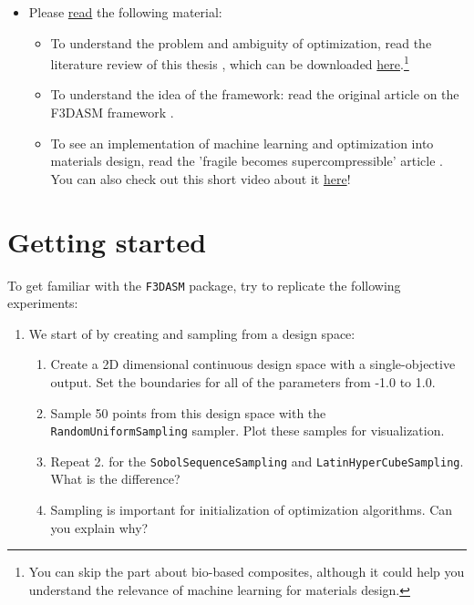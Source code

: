 \documentclass[10pt,a4paper,twoside]{article} %
\def\code#1{\texttt{#1}}
\begin{document}
\begin{itemize}
	\item Please \underline{read} the following material:
	
	\begin{itemize}
		
		\item To understand the problem and ambiguity of optimization, read the literature review of this thesis \cite{Schelling2021}, which can be downloaded \href{https://repository.tudelft.nl/islandora/object/uuid\%3Ad58271d6-21bb-470c-a5ee-4584b3b8ee29?collection=education}{here}.\footnote{You can skip the part about bio-based composites, although it could help you understand the relevance of machine learning for materials design.}
		
		\item To understand the idea of the framework: read the original article on the F3DASM framework \cite{Bessa2017}.
		
		\item To see an implementation of machine learning and optimization into materials design, read the 'fragile becomes supercompressible' article \cite{Bessa2019}. You can also check out this short video about it \href{https://www.youtube.com/watch?v=cWTWHhMAu7I}{here}!
		
	\end{itemize}
	
\end{itemize}



\section*{Getting started}

To get familiar with the \code{F3DASM} package, try to replicate the following experiments:


\begin{enumerate}
	\setcounter{enumi}{0}
	\item We start of by creating and sampling from a design space:

	\begin{enumerate} [label*=\arabic*.]
		\item Create a 2D dimensional continuous design space with a single-objective output. Set the boundaries for all of the parameters from -1.0 to 1.0.
		
		\item Sample 50 points from this design space with the \code{RandomUniformSampling} sampler. Plot these samples for visualization.
		
		\item Repeat 2. for the \code{SobolSequenceSampling} and \code{LatinHyperCubeSampling}. What is the difference?
		
		\item Sampling is important for initialization of optimization algorithms. Can you explain why?
	\end{enumerate}
\end{enumerate}
\end{document}
